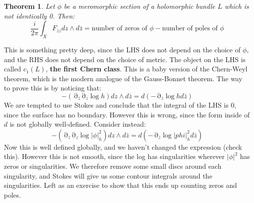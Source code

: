 \documentclass[12 pt]{article}
\DeclareMathOperator {\p} {\partial}
\theoremstyle{plain}
\newtheorem*{thm*}{Theorem}
\theoremstyle{definition}
\theoremstyle{remark}
\begin{document}
\begin{thm*}
Let $\phi$ be a meromorphic section of a holomorphic bundle $L$ which is not identically 0. Then:
\[      \frac{i}{2\pi} \int_X F_{\bar z z} dz \wedge d\bar z = \text{number of zeros of } \phi - \text{number of poles of } \phi      \]
\end{thm*}
This is something pretty deep, since the LHS does not depend on the choice of $\phi$, and the RHS does not depend on the choice of metric. The object on the LHS is called $c_1 (L)$, \textbf{the first Chern class}. This is a baby version of the Chern-Weyl theorem, which is the modern analogue of the Gauss-Bonnet theorem. The way to prove this is by noticing that:
\[      - (\p_{\bar z} \p_{z} \log h) dz \wedge d \bar z = d ( - \p_{\bar z} \log h d\bar z)      \]
We are tempted to use Stokes and conclude that the integral of the LHS is 0, since the surface has no boundary. However this is wrong, since the form inside of $d$ is not globally well-defined. Consider instead:
\[         - (\p_{\bar z} \p_{z} \log |\phi|^2_h) dz \wedge d \bar z  = d   ( - \p_{\bar z} \log |phi|^2_h d\bar z)     \]
Now this is well defined globally, and we haven't changed the expression (check this). However this is not smooth, since the log has singularities wherever $|\phi|^2$ has zeros or singularities. We therefore remove some small discs around each singularity, and Stokes will give us some contour integrals around the singularities. Left as an exercise to show that this ends up counting zeros and poles.
\end{document}
